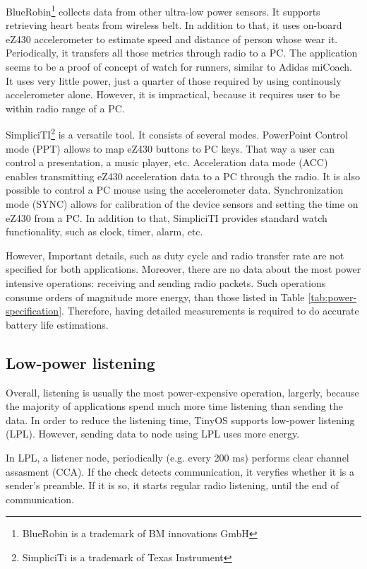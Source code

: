 BlueRobin\footnote{BlueRobin is a trademark of BM innovations GmbH} collects data from other ultra-low power sensors.
It supports retrieving heart beats from wireless belt.
In addition to that, it uses on-board eZ430 accelerometer to estimate speed and distance of person whose wear it.
Periodically, it transfers all those metrics through radio to a PC.
The application seems to be a proof of concept of watch for runners, similar to Adidas miCoach. 
It uses very little power, just a quarter of those required by using continously accelerometer alone.
However, it is impractical, because it requires user to be within radio range of a PC.

SimpliciTI\footnote{SimpliciTi is a trademark of Texas Instrument} is a versatile tool.
It consists of several modes.
PowerPoint Control mode (PPT) allows to map eZ430 buttons to PC keys.
That way a user can control a presentation, a music player, etc.
Acceleration data mode (ACC) enables transmitting eZ430 acceleration data to a PC through the radio.
It is also possible to control a PC mouse using the accelerometer data.
Synchronization mode (SYNC) allows for calibration of the device sensors and setting the time on eZ430 from a PC.
In addition to that, SimpliciTI provides standard watch functionality, such as clock, timer, alarm, etc. 

However, Important details, such as duty cycle and radio transfer rate are not specified for both applications.
Moreover, there are no data about the most power intensive operations: receiving and sending radio packets.
Such operations consume orders of magnitude more energy, than those listed in Table \ref{tab:power-specification}.
Therefore, having detailed measurements is required to do accurate battery life estimations.

\subsection{Low-power listening}
Overall, listening is usually the most power-expensive operation, largerly, because the majority of applications spend much more time listening than sending the data.
In order to reduce the listening time, TinyOS supports low-power listening (LPL).
However, sending data to node using LPL uses more energy.

In LPL, a listener node, periodically (e.g. every 200 ms) performs clear channel assasment (CCA).
If the check detects communication, it veryfies whether it is a sender's preamble.
If it is so, it starts regular radio listening, until the end of communication.

